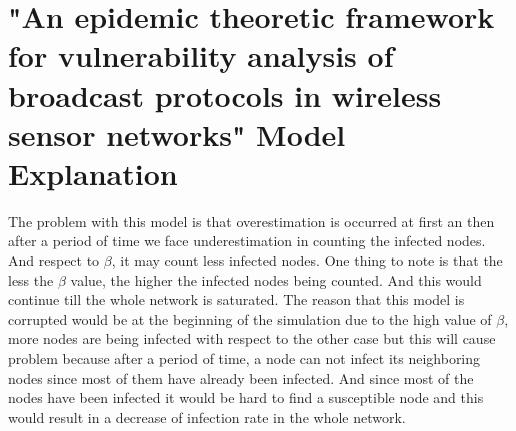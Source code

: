 \documentclass[a4paper]{article}
\begin{document}
	\section{"An epidemic theoretic framework for vulnerability analysis of broadcast protocols in wireless sensor networks" Model Explanation}
	
	The problem with this model is that overestimation is occurred at first an then after a period of time we face underestimation in counting the infected nodes. And respect to $\beta$, it may count less infected nodes. One thing to note is that the less the $\beta$ value, the higher the infected nodes being counted. And this would continue till the whole network is saturated. The reason that this model is corrupted would be at the beginning of the simulation due to the high value of $\beta$, more nodes are being infected with respect to the other case but this will cause problem because after a period of time, a node can not infect its neighboring nodes since most of them have already been infected. And since most of the nodes have been infected it would be hard to find a susceptible node and this would result in a decrease of infection rate in the whole network.
	\pagebreak
	
\end{document}
